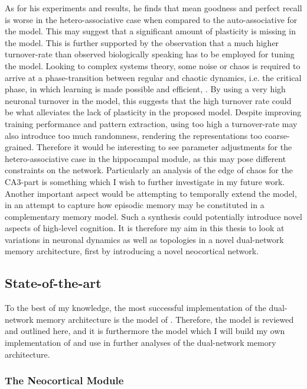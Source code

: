 As for his experiments and results, he finds that mean goodness and perfect recall is worse in the hetero-associative case when compared to the auto-associative for the model. This may suggest that a significant amount of plasticity is missing in the model. This is further supported by the observation that a much higher turnover-rate than observed biologically speaking has to be employed for tuning the model. Looking to complex systems theory, some noise or chaos is required to arrive at a phase-transition between regular and chaotic dynamics, i.e. the critical phase, in which learning is made possible and efficient, \cite{Langton1990, Newman2003}. By using a very high neuronal turnover in the model, this suggests that the high turnover rate could be what alleviates the lack of plasticity in the proposed model. Despite improving training performance and pattern extraction, using too high a turnover-rate may also introduce too much randomness, rendering the representations too coarse-grained. Therefore it would be interesting to see parameter adjustments for the hetero-associative case in the hippocampal module, as this may pose different constraints on the network. Particularly an analysis of the edge of chaos for the CA3-part is something which I wish to further investigate in my future work. Another important aspect would be attempting to temporally extend the model, in an attempt to capture how episodic memory may be constituted in a complementary memory model. Such a synthesis could potentially introduce novel aspects of high-level cognition. It is therefore my aim in this thesis to look at variations in neuronal dynamics as well as topologies in a novel dual-network memory architecture, first by introducing a novel neocortical network.

\subsection{State-of-the-art}

To the best of my knowledge, the most successful implementation of the dual-network memory architecture is the model of \cite{Hattori2014}. Therefore, the model is reviewed and outlined here, and it is furthermore the model which I will build my own implementation of and use in further analyses of the dual-network memory architecture.

\subsubsection{The Neocortical Module}


